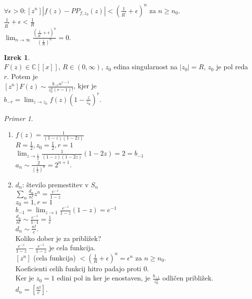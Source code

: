 \documentclass[a4paper, 12pt]{book}
\theoremstyle{definition}
\newtheorem{theorem}[counter]{Izrek}
\theoremstyle{remark}
\newtheorem*{ex}{Primer}
\newcommand{\C}{\mathbb{C}}
\begin{document}
$\forall \epsilon > 0: [z^n] \left|f(z) - PP_{f,z_0}(z)\right| < \left(\frac{1}{R^{'}}+\epsilon\right)^n$
za $n \geq n_0$. \\
$\frac{1}{R^{'}} + \epsilon < \frac{1}{R}$ \\
$\lim_{n \to \infty} \frac{\left(\frac{1}{R^{'}}+\epsilon\right)^n}{\left(\frac{1}{R}\right)^n} = 0$.
\begin{theorem} \text{} \\
  $F(z) \in \C[[x]]$, $R \in (0, \infty)$, $z_0$ edina singularnost na $|z_0| = R$, $z_0$ je pol reda $r$.
  Potem je \\
  $[z^n] F(z) \sim \frac{b_{-r} n^{r-1}}{z_0^n (r-1)!}$, kjer je \\
  $b_{-r} = \lim_{z \to z_0} f(z) \left(1-\frac{z}{z_0}\right)^r$.
\end{theorem}
\begin{ex} \text{} \\
  \begin{enumerate}[label=(\arabic*)]
    \item $f(z) = \frac{1}{(1-z) (1-2z)}$ \\
      $R = \frac{1}{2}, z_0 = \frac{1}{2}, r = 1$ \\
      $\lim_{z \to \frac{1}{2}} \frac{1}{(1-z) (1-2z)} (1-2z) = 2 = b_{-1}$ \\
      $a_n \sim \frac{2}{\left(\frac{1}{2}\right)^n} = 2^{n+1}$.
    \item $d_n$: število premestitev v $S_n$ \\
      $\sum_{n} \frac{d_n}{n!} z^n = \frac{e^{-z}}{1-z}$ \\
      $z_0 = 1, r = 1$ \\
      $b_{-1} = \lim_{z \to 1} \frac{e^{-z}}{1-z} (1-z) = e^{-1}$ \\
      $\frac{d_n}{n!} \sim \frac{e^{-1}}{1 \cdot 1} = \frac{1}{e}$ \\
      $d_n \sim \frac{n!}{e}$. \\
      Koliko dober je za približek? \\
      $\frac{e^{-z}}{1-z} - \frac{e^{-1}}{1-z}$ je cela funkcija. \\
      $[z^n]$ (cela funkcija) $< \left(\frac{1}{R} + \epsilon \right)^n = \epsilon^n$ za $n \geq n_0$. \\
      Koeficienti celih funkcij hitro padajo proti $0$. \\
      Ker je $z_0 = 1$ edini pol in ker je enostaven, je $\frac{b_{-1}}{z_0^n}$ odličen približek. \\
      $d_n = \left[\frac{n!}{e}\right]$.

\end{enumerate}
\end{ex}
\end{document}
